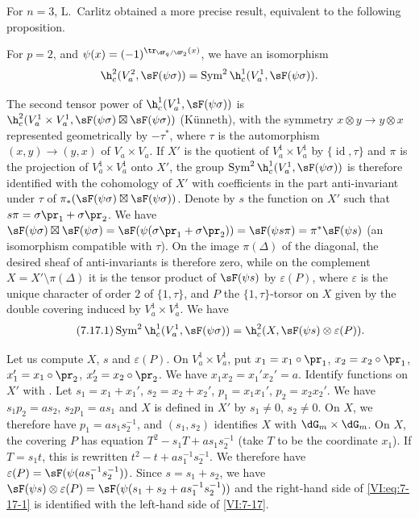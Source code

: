 For $n=3$, L.\ Carlitz  obtained a more precise result, 
equivalent to the following proposition. 





\begin{proposition_}\label{VI:7-17}
For $p=2$, and $\psi(x)=(-1)^{\tr_{\dF_q/\dF_2}(x)}$, we have an isomorphism 
\[
  \h_c^2(V_a^2,\sF(\psi\sigma)) = \operatorname{Sym}^2 \h_c^1(V_a^1,\sF(\psi\sigma)) \text{.} 
\]
\end{proposition_}

The second tensor power of $\h_c^1(V_a^1,\sF(\psi\sigma))$ is 
$\h_c^2(V_a^1\times V_a^1,\sF(\psi\sigma)\boxtimes \sF(\psi\sigma))$ 
(K\"unneth), with the symmetry $x\otimes y\to y\otimes x$ represented 
geometrically by $-\tau^\ast$, where $\tau$ is the automorphism 
$(x,y)\to (y,x)$ of $V_a\times V_a$. If $X'$ is the quotient of 
$V_a^1\times V_a^1$ by $\{\operatorname{id}{},\tau\}$ and $\pi$ is the 
projection of $V_a^1\times V_a^1$ onto $X'$, the group 
$\operatorname{Sym}^2 \h_c^1(V_a^1,\sF(\psi\sigma))$ is therefore identified with the 
cohomology of $X'$ with coefficients in the part anti-invariant under $\tau$ of 
$\pi_\ast(\sF(\psi\sigma)\boxtimes \sF(\psi\sigma))$. Denote by $s$ the function 
on $X'$ such that $s\pi =\sigma\pr_1+\sigma\pr_2$. We have 
$\sF(\psi\sigma)\boxtimes \sF(\psi\sigma) = \sF(\psi(\sigma\pr_1+\sigma\pr_2)) = \sF(\psi s \pi) = \pi^\ast \sF(\psi s)$ 
(an isomorphism compatible with $\tau$). On the image $\pi(\Delta)$ of the 
diagonal, the desired sheaf of anti-invariants is therefore zero, while on 
the complement $X=X'\setminus \pi(\Delta)$ it is the tensor product of 
$\sF(\psi s)$ by $\varepsilon(P)$, where $\varepsilon$ is the unique character 
of order $2$ of $\{1,\tau\}$, and $P$ the $\{1,\tau\}$-torsor on $X$ given by the 
double covering induced by $V_a^1\times V_a^1$. We have 
\begin{equation*}\tag{7.17.1}\label{VI:eq:7-17-1}
  \operatorname{Sym}^2 \h_c^1(V_a^1,\sF(\psi\sigma)) = \h_c^2(X,\sF(\psi s)\otimes \varepsilon(P)) \text{.}
\end{equation*}

Let us compute $X$, $s$ and $\varepsilon(P)$. On $V_a^1\times V_a^1$, put 
$x_1=x_1\circ\pr_1$, $x_2=x_2\circ\pr_1$, $x_1'=x_1\circ \pr_2$, 
$x_2'=x_2\circ \pr_2$. We have $x_1 x_2=x_1'x_2'=a$. Identify functions on 
$X'$ with . Let $s_1=x_1+x_1'$, 
$s_2=x_2+x_2'$, $p_1=x_1 x_1'$, $p_2=x_2 x_2'$. We have $s_1 p_2 = a s_2$, 
$s_2 p_1 = a s_1$ and $X$ is defined in $X'$ by $s_1\ne 0$, $s_2\ne 0$. On 
$X$, we therefore have $p_1 = a s_1 s_2^{-1}$, and $(s_1,s_2)$ identifies $X$ with 
$\dG_m\times \dG_m$. On $X$, the covering $P$ has equation 
$T^2-s_1 T+a s_1 s_2^{-1}$ (take $T$ to be the coordinate $x_1$). If 
$T=s_1 t$, this is rewritten $t^2-t+a s_1^{-1} s_2^{-1}$. We therefore have 
$\varepsilon(P) = \sF(\psi(a s_1^{-1} s_2^{-1}))$. Since $s=s_1+s_2$, we have 
$\sF(\psi s)\otimes \varepsilon(P) = \sF(\psi(s_1+s_2+ a s_1^{-1} s_2^{-1}))$ 
and the right-hand side of \eqref{VI:eq:7-17-1} is identified with the left-hand side of 
\ref{VI:7-17}. 


